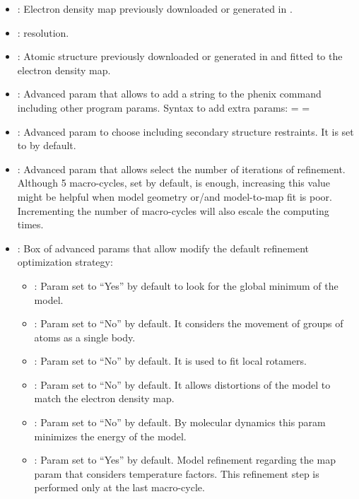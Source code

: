\begin{itemize}
    \begin{itemize}
     \item {}: Electron density map previously downloaded or generated in \scipion.
     \item {}:  resolution.
     \item {}: Atomic structure previously downloaded or generated in \scipion and fitted to the electron density map.
     \item {}: Advanced param that allows to add a string to the phenix command including other  program params. Syntax to add extra params:  =   = 
     \item {}: Advanced param to choose including secondary structure restraints. It is set to  by default.
     \item {}: Advanced param that allows select the number of iterations of refinement. Although 5 macro-cycles, set by default, is enough, increasing this value might be helpful when model geometry or/and model-to-map fit is poor. Incrementing the number of macro-cycles will also escale the computing times.
     \item {}: Box of advanced params that allow modify the default refinement optimization strategy:
      \begin{itemize}
       \item {}: Param set to ``Yes'' by default to look for the global minimum of the model. 
       \item {}: Param set to ``No'' by default. It considers the movement of groups of atoms as a single body.
       \item {}: Param set to ``No'' by default. It is used to fit local rotamers.
       \item {}: Param set to ``No'' by default. It allows distortions of the model to match the electron density map.
       \item {}: Param set to ``No'' by default. By molecular dynamics this param minimizes the energy of the model.
       \item {}: Param set to ``Yes'' by default. Model refinement regarding the map param that considers temperature factors. This refinement step is performed only at the last macro-cycle.
      \end{itemize}
    \end{itemize}
 

\end{itemize}
